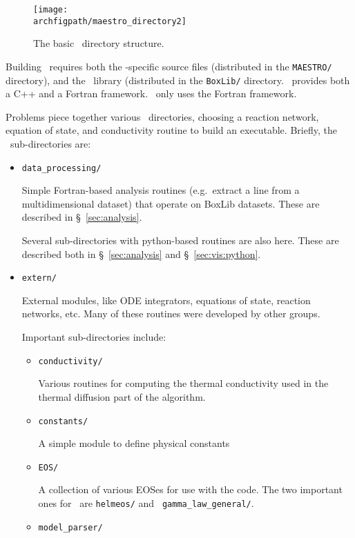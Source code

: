 \begin{figure}[t]
\centering
\texttt{[image: \\archfigpath/maestro\_directory2]}
\caption[\maestro\ directory structure]
{The basic \maestro\ directory structure.}
\end{figure}


Building \maestro\ requires both the \maestro-specific source
files (distributed in the {\tt MAESTRO/} directory), and the
\boxlib\ library (distributed in the {\tt BoxLib/} directory.
\boxlib\ provides both a C++ and a Fortran framework.  \maestro\
only uses the Fortran framework.

Problems piece together various \maestro\ directories, choosing a
reaction network, equation of state, and conductivity routine to build
an executable.  Briefly, the \maestro\ sub-directories are:
\begin{itemize}
\item {\tt data\_processing/}

  Simple Fortran-based analysis routines (e.g.\ extract a line from a
  multidimensional dataset) that operate on BoxLib datasets.  These are
  described in \S~\ref{sec:analysis}.

  Several sub-directories with python-based routines are also here.
  These are described both in \S~\ref{sec:analysis} and \S~\ref{sec:vis:python}.

\item {\tt extern/}

  External modules, like ODE integrators, equations of state, reaction
  networks, etc.  Many of these routines were developed by other groups.

  Important sub-directories include:
 
  \begin{itemize}
  \item {\tt conductivity/}

    Various routines for computing the thermal conductivity used in the
    thermal diffusion part of the algorithm.

  \item {\tt constants/}

    A simple module to define physical constants

  \item {\tt EOS/}

    A collection of various EOSes for use with the code.  The two
    important ones for \maestro\ are {\tt helmeos/} and {\tt
    gamma\_law\_general/}.

  \item {\tt model\_parser/}


\end{itemize}
\end{itemize}
